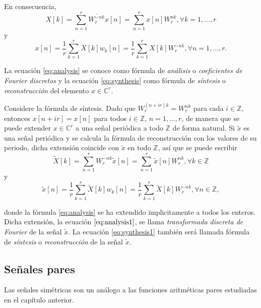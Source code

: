 En consecuencia,
\begin{equation}\label{eq:analysis}
    X[k] = \sum_{n=1}^{r} \overline{W_r^{-n k}} x[n] = \sum_{n=1}^{r} x[n] W_r^{n k}, \forall k=1,\ldots,r
\end{equation}
y
\begin{equation}\label{eq:synthesis}
    x[n] = \frac{1}{r} \sum_{k=1}^{r} X[k] w_k[n] = \frac{1}{r} \sum_{k=1}^{r} X[k] W_r^{- n k}, \forall n=1,\ldots,r.
\end{equation}

La ecuación \eqref{eq:analysis} se conoce como fórmula de \emph{análisis} o \emph{coeficientes de Fourier discretos} y la ecuación \eqref{eq:synthesis} como fórmula de \emph{síntesis} o \emph{reconstrucción} del elemento $x \in \mathbb{C}^r$.
\bigskip

Considere la fórmula de síntesis. Dado que $W_r^{(n + i r) k} = W_r^{n k}$ para cada $i \in \mathbb{Z}$, entonces $x[n + i r] = x[n]$ para todos $i \in \mathbb{Z}$, $n=1,\ldots,r$, de manera que se puede extender $x \in \mathbb{C}^r$ a una señal periódica a todo $\mathbb{Z}$ de forma natural. Si $\tilde{x}$ es una señal periódica y se calcula la fórmula de reconstrucción con los valores de su periodo, dicha extensión coincide con $\tilde{x}$ en todo $\mathbb{Z}$, así que se puede escribir
\begin{equation}\label{eq:analysis1}
    \tilde{X}[k] = \sum_{n=1}^{r} \overline{W_r^{-n k}} \tilde{x}[n] = \sum_{n=1}^{r} \tilde{x}[n] W_r^{n k}, \forall k \in \mathbb{Z}
\end{equation}
y
\begin{equation}\label{eq:synthesis1}
    \tilde{x}[n] = \frac{1}{r} \sum_{k=1}^{r} \tilde{X}[k] w_k[n] = \frac{1}{r} \sum_{k=1}^{r} \tilde{X}[k] W_r^{- n k}, \forall n \in \mathbb{Z},
\end{equation}

donde la fórmula \eqref{eq:analysis} se ha extendido implicitamente  a todos los enteros. Dicha extensión, la ecuación $\eqref{eq:analysis1}$, se llama \emph{transformada discreta de Fourier} de la señal $\tilde{x}$. La ecuación \eqref{eq:synthesis1} también será llamada fórmula de \emph{síntesis} o \emph{reconstrucción} de la señal $\tilde{x}$.

\subsection{Señales pares}

Las señales simétricas son un análogo a las funciones aritméticas pares estudiadas en el capítulo anterior.

